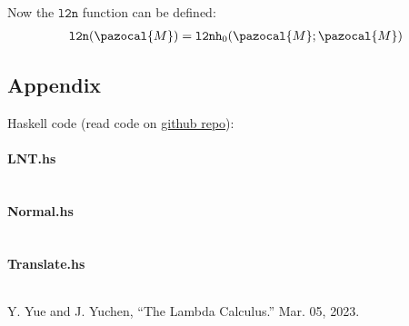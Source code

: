 \documentclass{article}
\theoremstyle{definition}
\begin{document}
Now the $\mathtt{l2n}$ function can be defined:
\begin{align*}
    \mathtt{l2n}(\pazocal{M}) = \mathtt{l2nh}_0(\pazocal{M};\pazocal{M})
\end{align*}

\subsection*{Appendix}

Haskell code (read code on \href{https://github.com/linsyking/SPELL23-Notes/tree/master/h2/lnt}{github repo}):

\paragraph*{LNT.hs}
\inputminted{haskell}{lnt/src/LNT.hs}

\paragraph*{Normal.hs}
\inputminted{haskell}{lnt/src/Normal.hs}

\paragraph*{Translate.hs}
\inputminted{haskell}{lnt/src/Translate.hs}

\begin{thebibliography}{9}
     Y. Yue and J. Yuchen, “The Lambda Calculus.” Mar. 05, 2023.
\end{thebibliography}
\end{document}
